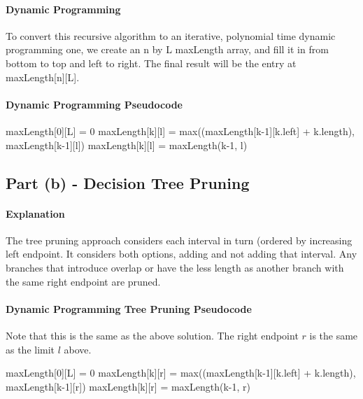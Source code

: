 \documentclass[12pt]{article}
\begin{document}
		\paragraph*{Dynamic Programming}
			To convert this recursive algorithm to an iterative, polynomial time dynamic programming one,
			we create an n by L maxLength array, and fill it in from bottom to top and left to right. The final
			result will be the entry at maxLength[n][L].
			
		\paragraph*{Dynamic Programming Pseudocode}
			\begin{algorithmic}
					\STATE maxLength[0][L] = 0
				\ENDFOR
							\STATE maxLength[k][l] = max((maxLength[k-1][k.left] + k.length), maxLength[k-1][l])
						\ELSE
							\STATE maxLength[k][l] = maxLength(k-1, l)
						\ENDIF
					\ENDFOR
				\ENDFOR
			\end{algorithmic}
	\subsection*{Part (b) - Decision Tree Pruning}
		\paragraph*{Explanation}
			The tree pruning approach considers each interval in turn (ordered by increasing left endpoint.
			It considers both options, adding and not adding that interval. Any branches that introduce
			overlap or have the less length as another branch with the same right endpoint are pruned.
			
			\paragraph*{Dynamic Programming Tree Pruning Pseudocode}
			Note that this is the same as the above solution. The right endpoint $r$ is the same as the limit
			$l$ above.
			\begin{algorithmic}
				\FOR {l = 1 \TO L}
					\STATE maxLength[0][L] = 0
				\ENDFOR
				\FOR {k = 1 \TO n}
					\FOR {r = 1 \TO L}
						\IF{k.right $<$ l}
							\STATE maxLength[k][r] = max((maxLength[k-1][k.left] + k.length), maxLength[k-1][r])
						\ELSE
							\STATE maxLength[k][r] = maxLength(k-1, r)
						\ENDIF
					\ENDFOR
				\ENDFOR
			\end{algorithmic}
\end{document}
